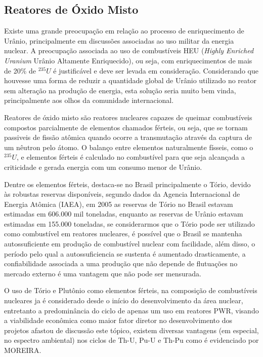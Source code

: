 \documentclass[
	12pt,				%
	openany,			%
	twoside,			%
	a4paper,			%
	english,			%
	french,				%
	spanish,			%
	brazil				%
	]{abntex2}
\begin{document}
\subsection*{Reatores de Óxido Misto}

Existe uma grande preocupação em relação ao processo de enriquecimento de Urânio, principalmente em discussões associadas ao uso militar da energia nuclear. A preocupação associada ao uso de combustíveis HEU (\emph{Highly Enriched Uranium} \textendash{} Urânio Altamente Enriquecido), ou seja, com enriquecimentos de mais de 20\% de $^{235}U$ é justificável e deve ser levada em consideração. Considerando que houvesse uma forma de reduzir a quantidade global de Urânio utilizado no reator sem alteração na produção de energia, esta solução seria muito bem vinda, principalmente aos olhos da comunidade internacional. 

Reatores de óxido misto são reatores nucleares capazes de queimar combustíveis compostos parcialmente de elementos chamados férteis, ou seja, que se tornam passiveis de fissão atômica quando ocorre a transmutação através da captura de um nêutron pelo átomo. O balanço entre elementos naturalmente físseis, como o $^{235}U$, e elementos férteis é calculado no combustível para que seja alcançada a criticidade e gerada energia com um consumo menor de Urânio. 

Dentre os elementos férteis, destaca-se no Brasil principalmente o Tório, devido às robustas reservas disponíveis, segundo dados da Agencia Internacional de Energia Atômica (IAEA), em 2005 as reservas de Tório no Brasil estavam estimadas em 606.000 mil toneladas, enquanto as reservas de Urânio estavam estimadas em 155.000 toneladas\cite{14physics_uranium}, se considerarmos que o Tório pode ser utilizado como combustível em reatores nucleares, é possível que o Brasil se mantenha autossuficiente em produção de combustível nuclear com facilidade, além disso, o período pelo qual a autossuficiencia se sustenta é aumentado drasticamente,
a confiabilidade associada a uma produção que não depende de flutuações no mercado externo é uma vantagem que não pode ser mensurada.

O uso de Tório e Plutônio como elementos férteis, na composição de combustíveis nucleares ja é considerado desde o início do desenvolvimento da área nuclear, entretanto a predominância do ciclo de apenas um uso em reatores PWR, visando a viabilidade econômica como maior fator diretor no desenvolvimento dos projetos afastou de discussão este tópico, existem diversas vantagens (em especial, no espectro ambiental) nos ciclos de Th-U, Pu-U e Th-Pu como é evidenciado por MOREIRA.
\end{document}
